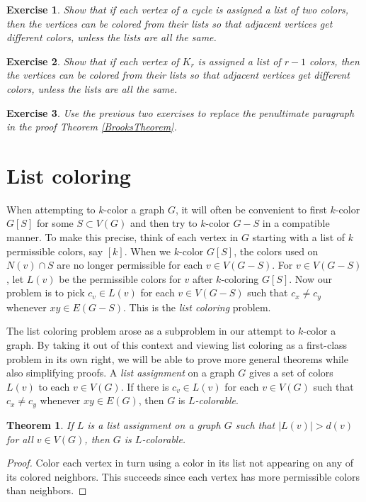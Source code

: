 \documentclass[openany]{tufte-book} %
\theoremstyle{plain}
\newtheorem{exercise}{Exercise}
\newtheorem{theorem}{Theorem}
\newcommand{\card}[1]{\left|#1\right|}
\newcommand{\irange}[1]{\left[#1\right]}
\begin{document}
\begin{exercise}
Show that if each vertex of a cycle is assigned a list of two colors, then the vertices can be colored from their lists so that adjacent vertices get different colors, unless
the lists are all the same.
\end{exercise}

\begin{exercise}
Show that if each vertex of $K_r$ is assigned a list of $r-1$ colors, then the vertices can be colored from their lists so that adjacent vertices get different colors, unless
the lists are all the same.
\end{exercise}

\begin{exercise}
Use the previous two exercises to replace the penultimate paragraph in the proof Theorem \ref{BrooksTheorem}.
\end{exercise}

\section{List coloring}
When attempting to $k$-color a graph $G$, it will often be convenient to first $k$-color $G[S]$ for some $S \subset V(G)$ and then try to 
$k$-color $G-S$ in a compatible manner. To make this precise, think of each vertex in $G$ starting with a list of $k$ permissible colors, say $\irange{k}$.
When we $k$-color $G[S]$, the colors used on $N(v) \cap S$ are no longer permissible for each $v \in V(G-S)$.  For $v \in V(G-S)$, let $L(v)$ be the permissible colors
for $v$ after $k$-coloring $G[S]$.  Now our problem is to pick $c_v \in L(v)$ for each $v \in V(G-S)$ such that $c_x \ne c_y$ whenever $xy \in E(G-S)$.  This is the
\emph{list coloring} problem.

The list coloring problem arose as a subproblem in our attempt to $k$-color a graph.  By taking it out of this context and viewing list coloring as a first-class problem in its own
right, we will be able to prove more general theorems while also simplifying proofs.  A \emph{list assignment} on a graph $G$ gives a set of colors $L(v)$ to each $v \in V(G)$.  
If there is $c_v \in L(v)$ for each $v \in V(G)$ such that $c_x \ne c_y$ whenever $xy \in E(G)$, then $G$ is \emph{$L$-colorable}.

\begin{theorem}\label{FirstListBound}
If $L$ is a list assignment on a graph $G$ such that $\card{L(v)} > d(v)$ for all $v \in V(G)$, then $G$ is $L$-colorable.
\end{theorem}
\begin{proof}
Color each vertex in turn using a color in its list not appearing on any of its colored neighbors.  
This succeeds since each vertex has more permissible colors than neighbors.
\end{proof}
\end{document}
